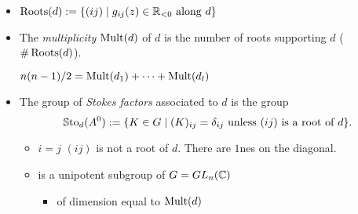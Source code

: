 \begin{defn}
\begin{center}
  \end{center}
\end{defn}
\begin{defn}
  \begin{itemize}
    \item $\operatorname{Roots}(d):=\{(ij)\mid g_{ij}(z)\in \mathbb{R}_{<0} \text{ along } d \}$
    \item The \emph{multiplicity} $\operatorname{Mult}(d)$ of $d$ is the number of roots
      supporting $d$ ($\#\operatorname{Roots}(d)$).
      \begin{rem}
        $n(n-1)/2=\operatorname{Mult}(d_1)+\cdots+\operatorname{Mult}(d_l)$
      \end{rem}
    \item The group of \emph{Stokes factors} associated to $d$ is the group
    \[
      \operatorname{\mathbb{S}to}_d(A^0) := \{K \in G \mid (K)_{ij}
        =\delta_{ij} \text{ unless } (ij) \text{ is a root of } d\}.
    \]
    \begin{itemize}
      \item $i=j$ \Rightarrow $(ij)$ is not a root of $d$. There are $1$nes
        on the diagonal.
      \item is a unipotent subgroup of $G=GL_n(\mathbb{C})$
        \begin{itemize}
          \item of dimension equal to $\operatorname{Mult}(d)$
        \end{itemize}
    \end{itemize}
  \end{itemize}
\end{defn}
